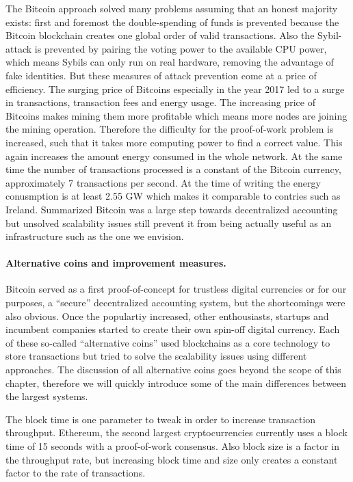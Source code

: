 The Bitcoin approach solved many problems assuming that an honest majority exists: first and 
foremost the double-spending of funds is prevented because the Bitcoin blockchain creates one global
order of valid transactions. Also the Sybil-attack is prevented by pairing the voting power to the
available CPU power, which means Sybils can only run on real hardware, removing the advantage of
fake identities. But these measures of attack prevention come at a price of efficiency. The surging 
price of Bitcoins especially in the year 2017 led to a surge in transactions, transaction fees and
energy usage. The increasing price of Bitcoins makes mining them more profitable which means more 
nodes are joining the mining operation. Therefore the difficulty for the proof-of-work problem is 
increased, such that it takes more computing power to find a correct value. This again increases the
amount energy consumed in the whole network. At the same time the number of transactions processed
is a constant of the Bitcoin currency, approximately 7 transactions per second. At the time of 
writing the energy conusmption is at least 2.55 GW which makes it comparable to contries such as 
Ireland. Summarized Bitcoin was a large step towards decentralized accounting but unsolved 
scalability issues still prevent it from being actually useful as an infrastructure such as the one 
we envision.

\paragraph{Alternative coins and improvement measures.}
Bitcoin served as a first proof-of-concept for trustless digital currencies or for our purposes, a
``secure'' decentralized accounting system, but the shortcomings were also obvious. Once the 
populartiy increased, other enthousiasts, startups and incumbent companies started to create their 
own spin-off digital currency. Each of these so-called ``alternative coins'' used blockchains as 
a core technology to store transactions but tried to solve the scalability issues using different 
approaches. The discussion of all alternative coins goes beyond the scope of this chapter, therefore
we will quickly introduce some of the main differences between the largest systems. 

The block time is one parameter to tweak in order to increase transaction throughput. Ethereum, the
second largest cryptocurrencies currently uses a block time of 15 seconds with a proof-of-work 
consensus. Also block size is a factor in the throughput rate, but increasing block time and size 
only creates a constant factor to the rate of transactions.

